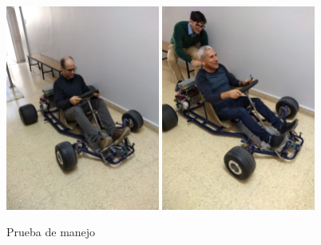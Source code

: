 \documentclass[a4paper]{article}
\begin{document}
%
\begin{figure}[h]
    \centering
    \includegraphics[width=0.45\textwidth]{figs/equipo5.jpg}
    \includegraphics[width=0.45\textwidth]{figs/equipo6.jpg}
    \caption{Prueba de manejo}
    \label{fig:equipo3}
\end{figure}
\end{document}
